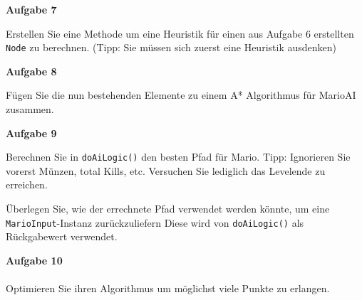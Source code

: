 \documentclass[a4paper,12pt]{article}
\newcommand{\Aufgabe}[1]{
  {
  \textsf{\textbf{Aufgabe #1}}
  
  }
}
\begin{document}
\Aufgabe 7
Erstellen Sie eine Methode um eine Heuristik für einen aus Aufgabe 6 erstellten \lstinline|Node| zu berechnen. (Tipp: Sie müssen sich zuerst eine Heuristik ausdenken) 

\Aufgabe 8
Fügen Sie die nun bestehenden Elemente zu einem A* Algorithmus für MarioAI zusammen.

\Aufgabe 9
Berechnen Sie in \lstinline|doAiLogic()| den besten Pfad für Mario.
Tipp: Ignorieren Sie vorerst Münzen, total Kills, etc. 
Versuchen Sie lediglich das Levelende zu erreichen.

Überlegen Sie, wie der errechnete Pfad verwendet werden könnte, um eine \lstinline|MarioInput|-Instanz zurückzuliefern 
Diese wird von \lstinline|doAiLogic()| als Rückgabewert verwendet.

\textsf{\textbf{Aufgabe 10}} \\ \\
Optimieren Sie ihren Algorithmus um möglichst viele Punkte zu erlangen.

\end{document}
